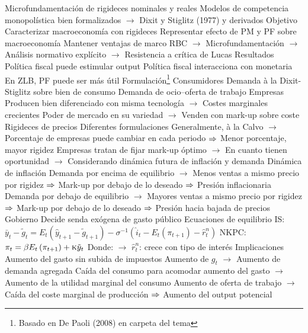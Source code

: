 \documentclass{nuevotema}
\begin{document}
\begin{esquemal}
				\4[] Microfundamentación de rigideces nominales y reales
				\4[] Modelos de competencia monopolística bien formalizados
				\4[] $\to$ Dixit y Stiglitz (1977) y derivados
				\4 Objetivo
				\4[] Caracterizar macroeconomía con rigideces
				\4[] Representar efecto de PM y PF sobre macroeconomía
				\4[] Mantener ventajas de marco RBC
				\4[] $\to$ Microfundamentación
				\4[] $\to$ Análisis normativo explícito
				\4[] $\to$ Resistencia a crítica de Lucas
				\4 Resultados
				\4[] Política fiscal puede estimular output
				\4[] Política fiscal interacciona con monetaria
				\4[] En ZLB, PF puede ser más útil
			\3 Formulación\footnote{Basado en De Paoli (2008) en carpeta del tema}
				\4 Consumidores
				\4[] Demanda à la Dixit-Stiglitz sobre bien de consumo
				\4[] Demanda de ocio--oferta de trabajo
				\4 Empresas
				\4[] Producen bien diferenciado con misma tecnología
				\4[] $\to$ Costes marginales crecientes
				\4[] Poder de mercado en su variedad
				\4[] $\to$ Venden con mark-up sobre coste
				\4 Rigideces de precios
				\4[] Diferentes formulaciones
				\4[] Generalmente, à la Calvo
				\4[] $\to$ Porcentaje de empresas puede cambiar en cada periodo
				\4[] $\Rightarrow$ Menor porcentaje, mayor rigidez
				\4[] Empresas tratan de fijar mark-up óptimo
				\4[] $\to$ En cuanto tienen oportunidad
				\4[] $\to$ Considerando dinámica futura de inflación y demanda
				\4 Dinámica de inflación
				\4[] Demanda por encima de equilibrio
				\4[] $\to$ Menos ventas a mismo precio por rigidez
				\4[] $\Rightarrow$ Mark-up por debajo de lo deseado
				\4[] $\Rightarrow$ Presión inflacionaria
				\4[] Demanda por debajo de equilibrio
				\4[] $\to$ Mayores ventas a mismo precio por rigidez
				\4[] $\Rightarrow$ Mark-up por debajo de lo deseado
				\4[] $\Rightarrow$ Presión hacia bajada de precios
				\4 Gobierno
				\4[] Decide senda exógena de gasto público
				\4 Ecuaciones de equilibrio
				\4[] IS: $\bar{y}_t - \tilde{g}_t = E_t \left( \hat{y}_{t+1} -\tilde{g}_{t+1} \right) - \sigma^{-1} \left( \hat{i}_t - E_t \left(    \pi_{t+1}\right) - \hat{r}_t^n  \right)$
				\4[] NKPC: $\pi_t = \beta E_t \left( \pi_{t+1} \right) + \textsc{k} \tilde{y}_t$
				\4[] Donde:
				\4[] $\to$ $\hat{r}_t^n$: crece con tipo de interés
			\3 Implicaciones
				\4 Aumento del gasto sin subida de impuestos
				\4[] Aumento de $g_t$
				\4[] $\to$ Aumento de demanda agregada
				\4[] Caída del consumo para acomodar aumento del gasto
				\4[] $\to$ Aumento de la utilidad marginal del consumo
				\4[] Aumento de oferta de trabajo
				\4[] $\to$ Caída del coste marginal de producción
				\4[] $\Rightarrow$ Aumento del output potencial

\end{esquemal}
\end{document}
